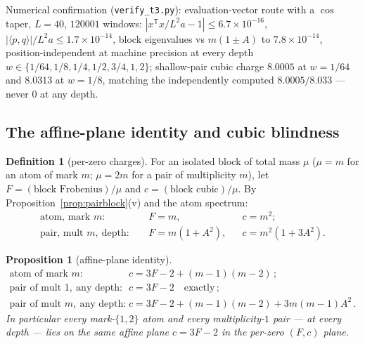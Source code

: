 \documentclass[11pt]{article}
\theoremstyle{plain}
\newtheorem{proposition}[theorem]{Proposition}
\theoremstyle{definition}
\newtheorem*{defn}{Definition}
\theoremstyle{remark}
\begin{document}
Numerical confirmation (\texttt{verify\_t3.py}): evaluation-vector
route with a $\cos$ taper, $L = 40$, $120001$ windows:
$|x^{\mathsf{T}} x / L^2 a - 1| \le 6.7 \times 10^{-16}$,
$|\langle p, q\rangle|/L^2 a \le 1.7 \times 10^{-14}$, block eigenvalues vs
$m(1 \pm A)$ to $7.8 \times 10^{-14}$, position-independent at machine precision
at every depth $w \in \{1/64, 1/8, 1/4, 1/2, 3/4, 1, 2\}$; shallow-pair cubic
charge $8.0005$ at $w = 1/64$ and $8.0313$ at $w = 1/8$, matching the
independently computed $8.0005 / 8.033$ --- never $0$ at any depth.

\subsection{The affine-plane identity and cubic blindness}

\begin{defn}[per-zero charges]
For an isolated block of total mass $\mu$ ($\mu = m$ for an atom of mark $m$;
$\mu = 2m$ for a pair of multiplicity $m$), let
$F = (\text{block Frobenius})/\mu$ and $c = (\text{block cubic})/\mu$. By
Proposition~\ref{prop:pairblock}(v) and the atom spectrum:
\begin{align*}
  \text{atom, mark } m: &\quad F = m, && c = m^2;\\
  \text{pair, mult } m,\ \text{depth}: &\quad F = m(1 + A^2),
    && c = m^2(1 + 3A^2).
\end{align*}
\end{defn}

\begin{proposition}[affine-plane identity]
\label{prop:affine}
\begin{align*}
  \text{atom of mark } m: &\quad c = 3F - 2 + (m-1)(m-2)\,;\\
  \text{pair of mult } 1,\ \text{any depth}: &\quad c = 3F - 2 \quad\text{exactly}\,;\\
  \text{pair of mult } m,\ \text{any depth}: &\quad
    c = 3F - 2 + (m-1)(m-2) + 3m(m-1)A^2 \,.
\end{align*}
In particular every mark-$\{1,2\}$ atom and every multiplicity-$1$ pair --- at
every depth --- lies on the same affine plane $c = 3F - 2$ in the per-zero
$(F, c)$ plane.
\end{proposition}
\end{document}
